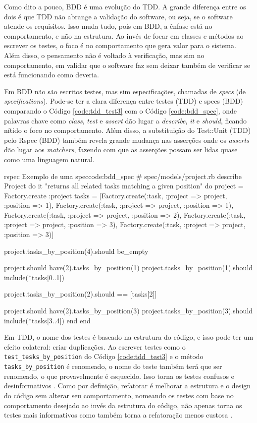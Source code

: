 Como dito a pouco, BDD é uma evolução do TDD. A grande diferença entre os dois é que TDD não abrange a validação do software, ou seja, se o software atende os requisitos. Isso muda tudo, pois em BDD, a ênfase está no comportamento, e não na estrutura. Ao invés de focar em classes e métodos ao escrever os testes, o foco é no comportamento que gera valor para o sistema. Além disso, o pensamento não é voltado à verificação, mas sim no comportamento, em validar que o software faz sem deixar também de verificar se está funcionando como deveria.

Em BDD não são escritos testes, mas sim especificações, chamadas de \textit{specs} (de \textit{specifications}). Pode-se ter a clara diferença entre testes (TDD) e specs (BDD) comparando o Código \ref{code:tdd_test3} com o Código \ref{code:bdd_spec}, onde palavras chave como \textit{class}, \textit{test} e \textit{assert} dão lugar a \textit{describe}, \textit{it} e \textit{should}, ficando nítido o foco no comportamento. Além disso, a substituição do Test::Unit (TDD) pelo Rspec (BDD) também revela grande mudança nas asserções onde os \textit{asserts} dão lugar aos \textit{matchers}, fazendo com que as asserções possam ser lidas quase como uma linguagem natural.

\begin{mycode}{rspec}%
{Exemplo de uma spec}{code:bdd_spec}
# spec/models/project.rb
describe Project do
  it "returns all related tasks matching a given position" do
    project = Factory.create :project
    tasks = [Factory.create(:task, :project => project, :position => 1),
             Factory.create(:task, :project => project, :position => 1),
             Factory.create(:task, :project => project, :position => 2),
             Factory.create(:task, :project => project, :position => 3),
             Factory.create(:task, :project => project, :position => 3)]

    project.tasks_by_position(4).should be_empty

    project.should have(2).tasks_by_position(1)
    project.tasks_by_position(1).should include(*tasks[0..1])

    project.tasks_by_position(2).should == [tasks[2]]

    project.should have(2).tasks_by_position(3)
    project.tasks_by_position(3).should include(*tasks[3..4])
  end
end
\end{mycode}

Em TDD, o nome dos testes é baseado na estrutura do código, e isso pode ter um efeito colateral: criar duplicações. Ao escrever testes como o \texttt{test\_tesks\_by\_position} do Código \ref{code:tdd_test3} e o método \texttt{tasks\_by\_position} é renomeado, o nome do teste também terá que ser renomeado, o que provavelmente é esquecido. Isso torna os testes confusos e desinformativos \cite{ContinuousTesting}. Como por definição, refatorar é melhorar a estrutura e o design do código sem alterar seu comportamento, nomeando os testes com base no comportamento desejado ao invés da estrutura do código, não apenas torna os testes mais informativos como também torna a refatoração menos custosa \cite{ContinuousTesting}.

